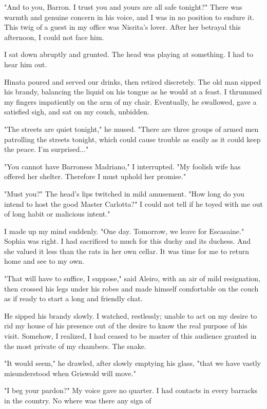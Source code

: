 \documentclass{article}
\begin{document}
"And to you, Barron. I trust you and yours are all safe tonight?" There was warmth and genuine concern in his voice, and I was in no position to endure it. This twig of a guest in my office was Nisrita's lover. After her betrayal this afternoon, I could not face him. 

I sat down abruptly and grunted. The head was playing at something. I had to hear him out. 

Hinata poured and served our drinks, then retired discretely. The old man sipped his brandy, balancing the liquid on his tongue as he would at a feast. I thrummed my fingers impatiently on the arm of my chair. Eventually, he swallowed, gave a satisfied sigh, and sat on my couch, unbidden.

"The streets are quiet tonight," he mused. "There are three groups of armed men patrolling the streets tonight, which could cause trouble as easily as it could keep the peace. I'm surprised..."

"You cannot have Barroness Madriano," I interrupted. "My foolish wife has offered her shelter. Therefore I must uphold her promise."

"Must you?" The head's lips twitched in mild amusement. "How long do you intend to host the good Master Carlotta?" I could not tell if he toyed with me out of long habit or malicious intent."

I made up my mind suddenly. "One day. Tomorrow, we leave for Escasaine." Sophia was right. I had sacrificed to much for this duchy and its duchess. And she valued it less than the rats in her own cellar. It was time for me to return home and see to my own. 

"That will have to suffice, I suppose," said Aleiro, with an air of mild resignation, then crossed his legs under his robes and made himself comfortable on the couch as if ready to start a long and friendly chat.

He sipped his brandy slowly. I watched, restlessly; unable to act on my desire to rid my house of his presence out of the desire to know the real purpose of his visit. Somehow, I realized, I had ceased to be master of this audience granted in the most private of my chambers. The snake.

"It would seem," he drawled, after slowly emptying his glass, "that we have vastly misunderstood when Griswold will move."

"I beg your pardon?" My voice gave no quarter. I had contacts in every barracks in the country. No where was there any sign of 
\end{document}
